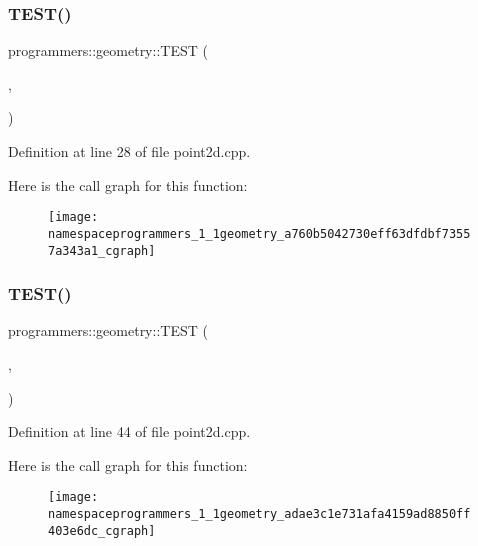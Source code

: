 \subsubsection{\texorpdfstring{T\+E\+S\+T()}{TEST()}\hspace{0.1cm}{\footnotesize\ttfamily [3/8]}}
{\footnotesize\ttfamily programmers\+::geometry\+::\+T\+E\+ST (\begin{DoxyParamCaption}\item[{Geometry\+Point2D}]{,  }\item[{Calculate\+Distance}]{ }\end{DoxyParamCaption})}



Definition at line 28 of file point2d.\+cpp.

Here is the call graph for this function\+:\nopagebreak
\begin{figure}[H]
\begin{center}
\leavevmode
\texttt{[image: namespaceprogrammers\_1\_1geometry\_a760b5042730eff63dfdbf73557a343a1\_cgraph]}
\end{center}
\end{figure}
\mbox{\label{namespaceprogrammers_1_1geometry_adae3c1e731afa4159ad8850ff403e6dc}} 
\subsubsection{\texorpdfstring{T\+E\+S\+T()}{TEST()}\hspace{0.1cm}{\footnotesize\ttfamily [4/8]}}
{\footnotesize\ttfamily programmers\+::geometry\+::\+T\+E\+ST (\begin{DoxyParamCaption}\item[{Geometry\+Point2D}]{,  }\item[{Static\+Calculate\+Distance}]{ }\end{DoxyParamCaption})}



Definition at line 44 of file point2d.\+cpp.

Here is the call graph for this function\+:\nopagebreak
\begin{figure}[H]
\begin{center}
\leavevmode
\texttt{[image: namespaceprogrammers\_1\_1geometry\_adae3c1e731afa4159ad8850ff403e6dc\_cgraph]}
\end{center}
\end{figure}
\mbox{\label{namespaceprogrammers_1_1geometry_a02af488d5cb15b8520f7718f275879c3}} 

